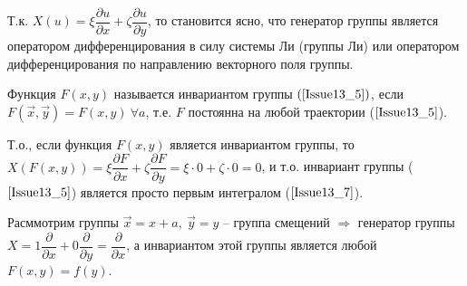 Т.к. $X(u) = \xi \dfrac{\partial u}{\partial x} + \zeta \dfrac{\partial u}{\partial y}$, то становится ясно, что генератор группы является оператором дифференцирования в силу системы Ли (группы Ли) или оператором дифференцирования по направлению векторного поля группы.

\begin{definition}
Функция $F(x,y)$ называется $\textbf{инвариантом группы}$ $(\ref{Issue13_5})$, если \
$F(\vec{x}, \vec{y}) = F(x,y)\  \forall a$, т.е. $F$ постоянна на любой траектории ($\ref{Issue13_5}$).
\end{definition}


Т.о., если функция $F(x,y)$ является инвариантом группы, то $X(F(x,y)) = \xi \dfrac{\partial F}{\partial x} + \zeta \dfrac{\partial F}{\partial y} = \xi \cdot 0 + \zeta \cdot 0 = 0$, и т.о. инвариант группы ($\ref{Issue13_5}$) является просто первым интегралом ($\ref{Issue13_7}$).

Расммотрим группы $\vec{x} = x + a,\ \vec{y} = y$ -- группа смещений $\Rightarrow$ генератор группы $X = 1 \dfrac{\partial}{\partial x} + 0 \dfrac{\partial}{\partial y} = \dfrac{\partial}{\partial x}$, а инвариантом этой группы является любой $F(x,y) = f(y)$.

